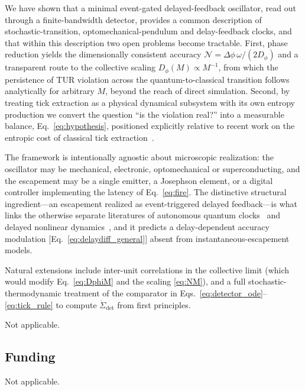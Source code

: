 \documentclass[aps,pre,reprint,amsmath,amssymb,floatfix,nofootinbib]{revtex4-2}
\newcommand{\Sdot}{\dot{\Sigma}}
\newcommand{\Dphi}{D_{\phi}}
\begin{document}
We have shown that a minimal event-gated delayed-feedback oscillator,
read out through a finite-bandwidth detector, provides a common
description of stochastic-transition, optomechanical-pendulum and
delay-feedback clocks, and that within this description two open problems
become tractable. First, phase reduction yields the dimensionally consistent accuracy
$\mathcal{N}=\Delta\phi\,\omega/(2\Dphi)$ and a transparent route to the
collective scaling $\Dphi(M)\propto M^{-1}$, from which the persistence
of TUR violation across the quantum-to-classical transition follows
analytically for arbitrary $M$, beyond the reach of direct simulation.
Second, by treating tick extraction as a physical dynamical subsystem
with its own entropy production we convert the question ``is the
violation real?'' into a measurable balance, Eq.~\eqref{eq:hypothesis},
positioned explicitly relative to recent work on the entropic cost of
classical tick extraction~\cite{Wadhia2025}.

The framework is intentionally agnostic about microscopic realization:
the oscillator may be mechanical, electronic, optomechanical or
superconducting, and the escapement may be a single emitter, a Josephson
element, or a digital controller implementing the latency of
Eq.~\eqref{eq:fire}. The distinctive structural ingredient---an
escapement realized as event-triggered delayed feedback---is what links
the otherwise separate literatures of autonomous quantum
clocks~\cite{Erker2017,Brunelli2026} and delayed nonlinear
dynamics~\cite{GiacomelliPoliti1996,YanchukGiacomelli2017}, and it
predicts a delay-dependent accuracy modulation
[Eq.~\eqref{eq:delaydiff_general}] absent from instantaneous-escapement models.

Natural extensions include inter-unit correlations in the collective
limit (which would modify Eq.~\eqref{eq:DphiM} and the scaling
\eqref{eq:NM}), and a full stochastic-thermodynamic treatment of the
comparator in Eqs.~\eqref{eq:detector_ode}--\eqref{eq:tick_rule} to compute $\Sdot_{\mathrm{det}}$
from first principles.


\hypersetup{bookmarksdepth=1}
\backmatter

Not applicable.


\subsection*{Funding}
    Not applicable.
\end{document}
